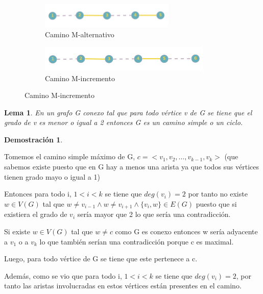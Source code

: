 \documentclass[a4paper,1pt]{report}
\newtheorem*{dem}{Demostración}
\newtheorem*{lem}{Lema}
\begin{document}
\begin{figure}[H]
    \centering
    \begin{subfigure}[b]{0.80\textwidth}
        \centering
        \includegraphics[width=0.7\textwidth]{figures7/malternativo.png}
        \caption{Camino M-alternativo}
    \end{subfigure} 
    \begin{subfigure}[b]{0.70\textwidth}
        \centering
        \includegraphics[width=0.9\textwidth]{figures7/mincremento.png}
        \caption{Camino M-incremento}
    \end{subfigure}
\end{figure} 

\begin{lem}
 En un grafo G conexo tal que para todo vértice  v de G se tiene que el grado de v es menor o igual a 2 entonces G es un camino simple o un ciclo.
\end{lem}

\begin{dem}
 
\end{dem}


Tomemos el camino simple máximo de G, $c=<v_1,v_2,\dots,v_{k-1},v_k>$ (que sabemos existe puesto que en G hay a menos una arista ya que todos sus v\'ertices tienen grado mayo o igual a 1)

Entonces para todo i, $1 < i < k$ se tiene que $deg(v_i)=2$ por tanto no existe $w\in V(G)$ tal que  $w\neq v_{i-1}\wedge w\neq v_{i+1}\wedge \{v_i,w\}\in E(G)$ puesto que si existiera el grado de $v_i$ sería mayor que 2 lo que sería una contradicción.

Si existe $w\in V(G)$ tal que $w\neq c$ como G  es conexo entonces w sería adyacente a $v_1$ o a $v_k$ lo que también serían una contradicción porque c es maximal.

Luego, para todo vértice de G se tiene que este pertenece a c.

Además, como se vio que para todo i, $1 < i < k$ se tiene que $deg(v_i)=2$, por  tanto las aristas involucradas en estos vértices están presentes en el camino.
\end{document}
